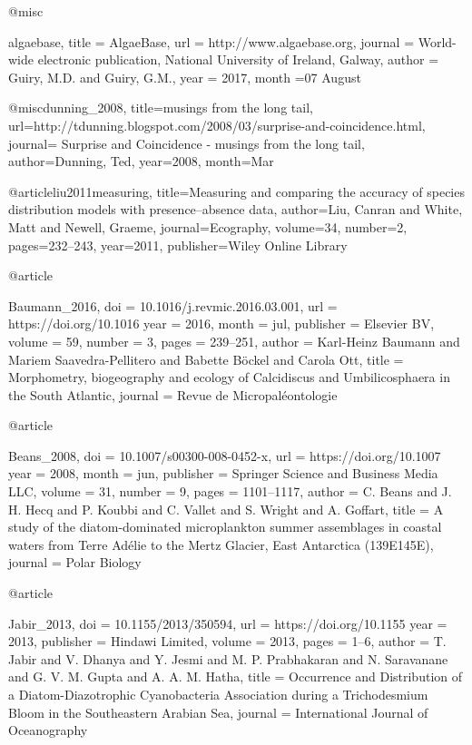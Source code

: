 {@misc{algaebase,
title = {AlgaeBase},
url = {http://www.algaebase.org},
journal = {World-wide electronic publication, National University of Ireland, Galway},
author = {Guiry, M.D. and Guiry, G.M.},
year = {2017},
month ={07 August}

}

@misc{dunning_2008,
	title={musings from the long tail},
	url={http://tdunning.blogspot.com/2008/03/surprise-and-coincidence.html},
	journal={ Surprise and Coincidence - musings from the long tail},
	author={Dunning, Ted},
	year={2008},
	month={Mar}
} 

@article{liu2011measuring,
  title={Measuring and comparing the accuracy of species distribution models with presence--absence data},
  author={Liu, Canran and White, Matt and Newell, Graeme},
  journal={Ecography},
  volume={34},
  number={2},
  pages={232--243},
  year={2011},
  publisher={Wiley Online Library}
}

@article{Baumann_2016,
	doi = {10.1016/j.revmic.2016.03.001},
	url = {https://doi.org/10.1016%
	year = 2016,
	month = {jul},
	publisher = {Elsevier {BV}},
	volume = {59},
	number = {3},
	pages = {239--251},
	author = {Karl-Heinz Baumann and Mariem Saavedra-Pellitero and Babette Böckel and Carola Ott},
	title = {Morphometry, biogeography and ecology of Calcidiscus and Umbilicosphaera in the South Atlantic},
	journal = {Revue de Micropal{\'{e}}ontologie}
}

@article{Beans_2008,
	doi = {10.1007/s00300-008-0452-x},
	url = {https://doi.org/10.1007%
	year = 2008,
	month = {jun},
	publisher = {Springer Science and Business Media {LLC}},
	volume = {31},
	number = {9},
	pages = {1101--1117},
	author = {C. Beans and J. H. Hecq and P. Koubbi and C. Vallet and S. Wright and A. Goffart},
	title = {A study of the diatom-dominated microplankton summer assemblages in coastal waters from Terre Ad{\'{e}}lie to the Mertz Glacier, East Antarctica (139{\textdegree}E{\textendash}145{\textdegree}E)},
	journal = {Polar Biology}
}


@article{Jabir_2013,
	doi = {10.1155/2013/350594},
	url = {https://doi.org/10.1155%
	year = 2013,
	publisher = {Hindawi Limited},
	volume = {2013},
	pages = {1--6},
	author = {T. Jabir and V. Dhanya and Y. Jesmi and M. P. Prabhakaran and N. Saravanane and G. V. M. Gupta and A. A. M. Hatha},
	title = {Occurrence and Distribution of a Diatom-Diazotrophic Cyanobacteria Association during a Trichodesmium Bloom in the Southeastern Arabian Sea},
	journal = {International Journal of Oceanography}
}

}}}}

